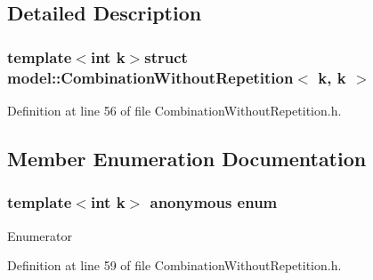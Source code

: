 \subsection{Detailed Description}
\subsubsection*{template$<$int k$>$struct model\+::\+Combination\+Without\+Repetition$<$ k, k $>$}



Definition at line 56 of file Combination\+Without\+Repetition.\+h.



\subsection{Member Enumeration Documentation}
\hypertarget{structmodel_1_1_combination_without_repetition_3_01k_00_01k_01_4_a73e327cd8a465ccb14581e370785e0f8}{}\subsubsection[{anonymous enum}]{\setlength{\rightskip}{0pt plus 5cm}template$<$int k$>$ anonymous enum}\label{structmodel_1_1_combination_without_repetition_3_01k_00_01k_01_4_a73e327cd8a465ccb14581e370785e0f8}
\begin{Desc}
\item[Enumerator]\par
\begin{description}
\item[{\em 
\hypertarget{structmodel_1_1_combination_without_repetition_3_01k_00_01k_01_4_a73e327cd8a465ccb14581e370785e0f8a5fed5b863dfa40e08486cabecd320ade}{}N\label{structmodel_1_1_combination_without_repetition_3_01k_00_01k_01_4_a73e327cd8a465ccb14581e370785e0f8a5fed5b863dfa40e08486cabecd320ade}
}]\end{description}
\end{Desc}


Definition at line 59 of file Combination\+Without\+Repetition.\+h.

